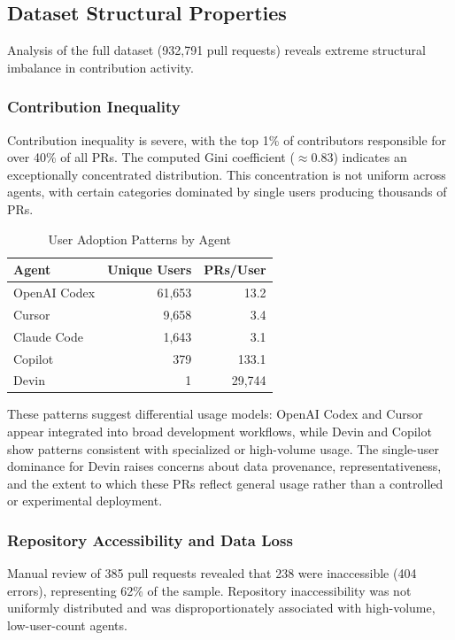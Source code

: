 \documentclass[conference]{IEEEtran}
\begin{document}
\subsection{Dataset Structural Properties}

Analysis of the full dataset (932,791 pull requests) reveals extreme structural imbalance in contribution activity.

\subsubsection{Contribution Inequality}

Contribution inequality is severe, with the top 1\% of contributors responsible for over 40\% of all PRs. The computed Gini coefficient ($\approx 0.83$) indicates an exceptionally concentrated distribution. This concentration is not uniform across agents, with certain categories dominated by single users producing thousands of PRs.

\begin{table}[t]
\centering
\caption{User Adoption Patterns by Agent}
\label{tab:adoption}
\begin{tabular}{@{}lrr@{}}
\toprule
\textbf{Agent} & \textbf{Unique Users} & \textbf{PRs/User} \\
\midrule
OpenAI Codex & 61,653 & 13.2 \\
Cursor & 9,658 & 3.4 \\
Claude Code & 1,643 & 3.1 \\
Copilot & 379 & 133.1 \\
Devin & 1 & 29,744 \\
\bottomrule
\end{tabular}
\end{table}

These patterns suggest differential usage models: OpenAI Codex and Cursor appear integrated into broad development workflows, while Devin and Copilot show patterns consistent with specialized or high-volume usage. The single-user dominance for Devin raises concerns about data provenance, representativeness, and the extent to which these PRs reflect general usage rather than a controlled or experimental deployment.

\subsubsection{Repository Accessibility and Data Loss}

Manual review of 385 pull requests revealed that 238 were inaccessible (404 errors), representing 62\% of the sample. Repository inaccessibility was not uniformly distributed and was disproportionately associated with high-volume, low-user-count agents.
\end{document}
